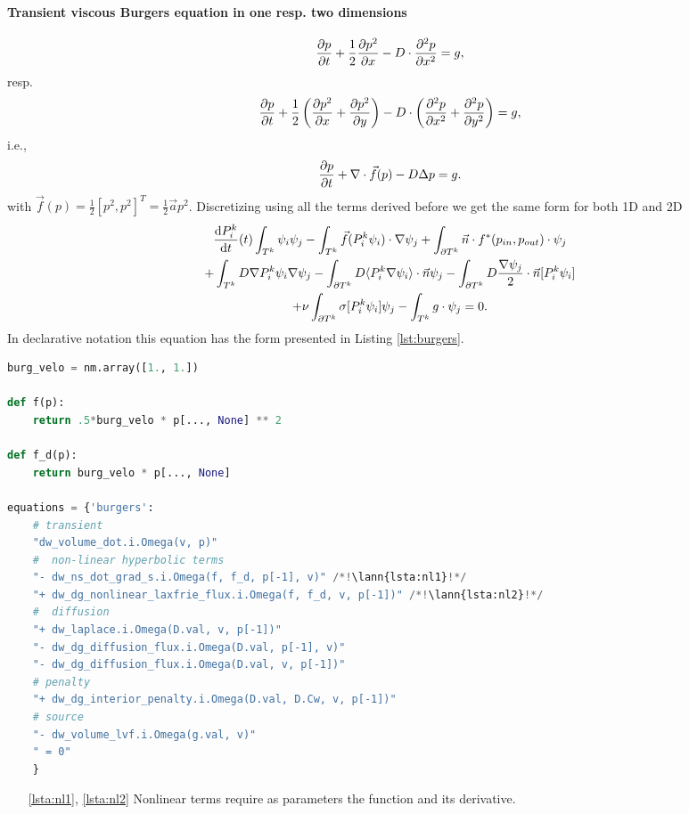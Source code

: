 \paragraph{Transient viscous Burgers equation in one resp. two dimensions}
\begin{equation}
\frac{\partial p}{\partial t} + \frac{1}{2}\frac{\partial p^2}{\partial x} - D \cdot\frac{\partial^2 p}{\partial x^2} = g,
\end{equation}
resp.
\begin{equation}
\label{eq:ex_burgers}
    \frac{\partial p}{\partial t} + \frac{1}{2}\left(\frac{\partial p^2}{\partial x} + \frac{\partial p^2}{\partial y}\right)  -
    D \cdot \left( \frac{\partial^2 p}{\partial x^2} + \frac{\partial^2 p}{\partial y^2} \right)
    = g,
\end{equation}
i.e.,
\begin{equation}
    \frac{\partial p}{\partial t} + \nabla \cdot \vec{f}(p) - D\Delta p = g.
\end{equation}
with $\vec{f}(p) = \frac{1}{2}[p^2, p^2]^T = \frac{1}{2}\vec{a} p^2$.
Discretizing using all the terms derived before we get the same form for both 1D and 2D
\begin{multline}
    \frac{\text{d}P^k_i}{\text{d}t}(t)\int_{T^k}\psi_i\psi_j
    - \int_{T^k} \vec{f}(P_i^k\psi_i)\cdot\nabla\psi_j
    + \int_{\partial{T^k}} \vec{n} \cdot f^{*} (p_{in}, p_{out})\cdot\psi_j\\
    + \int_{T^k} D\nabla P^k_i\psi_i \nabla \psi_j
    - \int_{\partial T^k} D \langle P^k_i\nabla\psi_i\rangle \cdot \vec{n}\psi_j
    - \int_{\partial T^k} D \frac{\nabla \psi_j}{2}\cdot \vec{n} [P^k_i\psi_i] \\
    + \nu \int_{\partial T^k} \sigma [P^k_i\psi_i]\psi_j
    - \int_{T^k} g\cdot \psi_j
    = 0.
\end{multline}
In \sfepy{} declarative notation this equation has the form presented in
Listing \ref{lst:burgers}.
\setcounter{lstannotation}{0}
\begin{lstlisting}[language=Python, caption=Viscous Burgers equation \label{lst:burgers}]
burg_velo = nm.array([1., 1.])

def f(p):
    return .5*burg_velo * p[..., None] ** 2

def f_d(p):
    return burg_velo * p[..., None]

equations = {'burgers':
    # transient
    "dw_volume_dot.i.Omega(v, p)"
    #  non-linear hyperbolic terms
    "- dw_ns_dot_grad_s.i.Omega(f, f_d, p[-1], v)" /*!\lann{lsta:nl1}!*/
    "+ dw_dg_nonlinear_laxfrie_flux.i.Omega(f, f_d, v, p[-1])" /*!\lann{lsta:nl2}!*/
    #  diffusion
    "+ dw_laplace.i.Omega(D.val, v, p[-1])"
    "- dw_dg_diffusion_flux.i.Omega(D.val, p[-1], v)"
    "- dw_dg_diffusion_flux.i.Omega(D.val, v, p[-1])"
    # penalty
    "+ dw_dg_interior_penalty.i.Omega(D.val, D.Cw, v, p[-1])"
    # source
    "- dw_volume_lvf.i.Omega(g.val, v)"
    " = 0"
    }
\end{lstlisting}
\begin{itemize}
    \item[\ref{lsta:nl1}, \ref{lsta:nl2}] Nonlinear terms require as parameters the function
    and its derivative.
\end{itemize}


